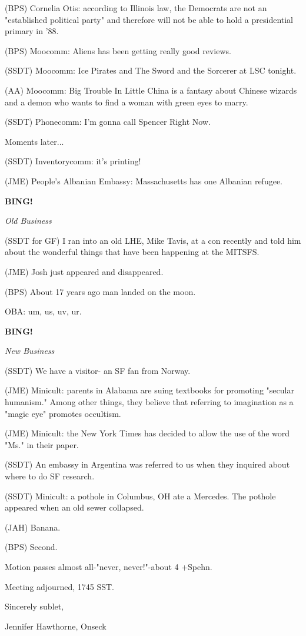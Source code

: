 \documentclass[12pt]{article}
\newcommand{\bing}{{\bf BING!} }
\newcommand{\goto}[1]{\bing \vskip 12pt \centerline{{\em{#1}}}}
\begin{document}
(BPS) Cornelia Otis: according to Illinois law, the Democrats are not an "established political party" and therefore will not be able to hold a presidential primary in '88.

(BPS) Moocomm: Aliens has been getting really good reviews.

(SSDT) Moocomm: Ice Pirates and The Sword and the Sorcerer at LSC tonight.

(AA) Moocomm: Big Trouble In Little China is a fantasy about Chinese wizards and a demon who wants to find a woman with green eyes to marry.

(SSDT) Phonecomm: I'm gonna call Spencer Right Now.

Moments later...

(SSDT) Inventorycomm: it's printing!

(JME) People's Albanian Embassy: Massachusetts has one Albanian refugee.

\goto{Old Business}

(SSDT for GF) I ran into an old LHE, Mike Tavis, at a con recently and told him about the wonderful things that have been happening at the MITSFS.

(JME) Josh just appeared and disappeared.

(BPS) About 17 years ago man landed on the moon.

OBA: um, us, uv, ur.

\goto{New Business}

(SSDT) We have a visitor- an SF fan from Norway.

(JME) Minicult: parents in Alabama are suing textbooks for promoting "secular humanism." Among other things, they believe that referring to imagination as a "magic eye" promotes occultism.

(JME) Minicult: the New York Times has decided to allow the use of the word "Ms." in their paper.

(SSDT) An embassy in Argentina was referred to us when they inquired about where to do SF research.

(SSDT) Minicult: a pothole in Columbus, OH ate a Mercedes. The pothole appeared when an old sewer collapsed.

(JAH) Banana.

(BPS) Second.

Motion passes almost all-"never, never!"-about 4 +Spehn.

\vspace{12pt}

\noindent
Meeting adjourned, 1745 SST.

\vspace{18pt}

\centerline{Sincerely sublet,}
\centerline{Jennifer Hawthorne, Onseck}
\end{document}
